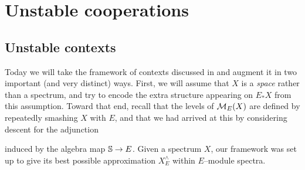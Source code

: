
\chapter{Unstable cooperations}





\section{Unstable contexts}

Today we will take the framework of contexts discussed in  and augment it in two important (and very distinct) ways.  First, we will assume that $X$ is a \emph{space} rather than a spectrum, and try to encode the extra structure appearing on $E_* X$ from this assumption.  Toward that end, recall that the levels of $\context{E}(X)$ are defined by repeatedly smashing $X$ with $E$, and that we had arrived at this by considering descent for the adjunction
\begin{center}
\end{center}
induced by the algebra map $\S \to E$.  Given a spectrum $X$, our framework was set up to give its best possible approximation $X^\wedge_E$ within $E$--module spectra.

